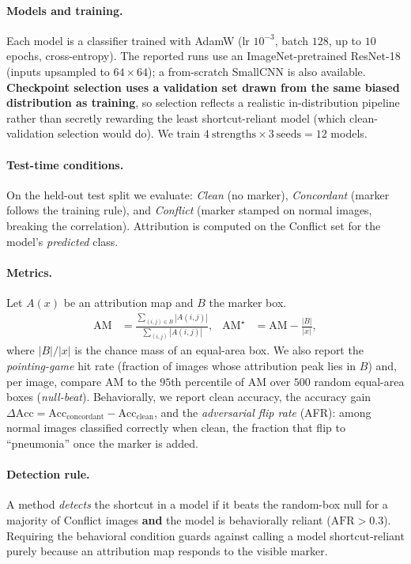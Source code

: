 \documentclass[11pt]{article}
\begin{document}
\paragraph{Models and training.} Each model is a classifier trained with AdamW (lr $10^{-3}$,
batch $128$, up to $10$ epochs, cross-entropy). The reported runs use an ImageNet-pretrained
ResNet-18 \citep{he2016resnet} (inputs upsampled to $64\times64$); a from-scratch SmallCNN is also
available. \textbf{Checkpoint selection uses a validation set drawn from the same biased
distribution as training}, so selection reflects a realistic in-distribution pipeline rather than
secretly rewarding the least shortcut-reliant model (which clean-validation selection would do).
We train $4~\text{strengths}\times 3~\text{seeds}=12$ models.

\paragraph{Test-time conditions.} On the held-out test split we evaluate: \emph{Clean} (no marker),
\emph{Concordant} (marker follows the training rule), and \emph{Conflict} (marker stamped on normal
images, breaking the correlation). Attribution is computed on the Conflict set for the model's
\emph{predicted} class.

\paragraph{Metrics.} Let $A(x)$ be an attribution map and $B$ the marker box.
\begin{align}
\mathrm{AM} &= \frac{\sum_{(i,j)\in B}|A(i,j)|}{\sum_{(i,j)}|A(i,j)|},
& \mathrm{AM}^{\star} &= \mathrm{AM} - \frac{|B|}{|x|},
\end{align}
where $|B|/|x|$ is the chance mass of an equal-area box. We also report the \emph{pointing-game}
hit rate (fraction of images whose attribution peak lies in $B$) and, per image, compare
$\mathrm{AM}$ to the $95$th percentile of $\mathrm{AM}$ over $500$ random equal-area boxes
(\emph{null-beat}). Behaviorally, we report clean accuracy, the accuracy gain
$\Delta\mathrm{Acc}=\mathrm{Acc}_{\text{concordant}}-\mathrm{Acc}_{\text{clean}}$, and the
\emph{adversarial flip rate} (AFR): among normal images classified correctly when clean, the
fraction that flip to ``pneumonia'' once the marker is added.

\paragraph{Detection rule.} A method \emph{detects} the shortcut in a model if it beats the random-box
null for a majority of Conflict images \textbf{and} the model is behaviorally reliant
($\mathrm{AFR}>0.3$). Requiring the behavioral condition guards against calling a model
shortcut-reliant purely because an attribution map responds to the visible marker.
\end{document}
